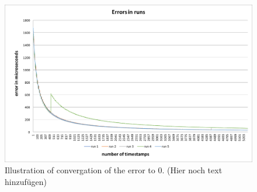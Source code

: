 \documentclass[12pt, a4paper]{report}
\begin{document}
    \begin{figure}[H]
      \includegraphics[scale=0.5]{Images/error_led_rgb.png}
  
    \caption{ Illustration of convergation of the error to 0. (Hier noch text hinzufügen)}
    \end{figure}  
\end{document}
